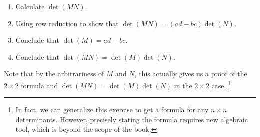 \begin{exercises}
\begin{problist}
      \begin{enumerate}
        \item Calculate \(\det(MN)\).
        \item Using row reduction to show that \(\det(MN)=(ad-bc)\det(N)\).
        \item Conclude that \(\det(M)=ad-bc\).
        \item Conclude that \(\det(MN)=\det(M)\det(N)\).
      \end{enumerate}
      Note that by the arbitrariness of \(M\) and \(N\), this actually gives us a proof of the \(2\times 2\) formula and \(\det(MN)=\det(M)\det(N)\) in the \(2\times 2\) case. \footnote{In fact, we can generalize this exercise to get a formula for any \(n\times n\) determinants. However, precisely stating the formula requires new algebraic tool, which is beyond the scope of the book.}
\end{problist}
\end{exercises}